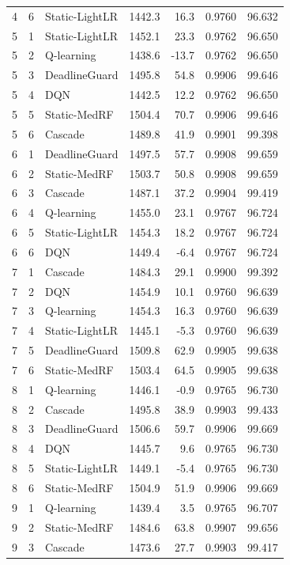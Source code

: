 \begin{longtable}{rrlrrrr}
4 & 6 & Static-LightLR & 1442.3 & 16.3 & 0.9760 & 96.632\\
5 & 1 & Static-LightLR & 1452.1 & 23.3 & 0.9762 & 96.650\\
5 & 2 & Q-learning & 1438.6 & -13.7 & 0.9762 & 96.650\\
5 & 3 & DeadlineGuard & 1495.8 & 54.8 & 0.9906 & 99.646\\
5 & 4 & DQN & 1442.5 & 12.2 & 0.9762 & 96.650\\
5 & 5 & Static-MedRF & 1504.4 & 70.7 & 0.9906 & 99.646\\
5 & 6 & Cascade & 1489.8 & 41.9 & 0.9901 & 99.398\\
6 & 1 & DeadlineGuard & 1497.5 & 57.7 & 0.9908 & 99.659\\
6 & 2 & Static-MedRF & 1503.7 & 50.8 & 0.9908 & 99.659\\
6 & 3 & Cascade & 1487.1 & 37.2 & 0.9904 & 99.419\\
6 & 4 & Q-learning & 1455.0 & 23.1 & 0.9767 & 96.724\\
6 & 5 & Static-LightLR & 1454.3 & 18.2 & 0.9767 & 96.724\\
6 & 6 & DQN & 1449.4 & -6.4 & 0.9767 & 96.724\\
7 & 1 & Cascade & 1484.3 & 29.1 & 0.9900 & 99.392\\
7 & 2 & DQN & 1454.9 & 10.1 & 0.9760 & 96.639\\
7 & 3 & Q-learning & 1454.3 & 16.3 & 0.9760 & 96.639\\
7 & 4 & Static-LightLR & 1445.1 & -5.3 & 0.9760 & 96.639\\
7 & 5 & DeadlineGuard & 1509.8 & 62.9 & 0.9905 & 99.638\\
7 & 6 & Static-MedRF & 1503.4 & 64.5 & 0.9905 & 99.638\\
8 & 1 & Q-learning & 1446.1 & -0.9 & 0.9765 & 96.730\\
8 & 2 & Cascade & 1495.8 & 38.9 & 0.9903 & 99.433\\
8 & 3 & DeadlineGuard & 1506.6 & 59.7 & 0.9906 & 99.669\\
8 & 4 & DQN & 1445.7 & 9.6 & 0.9765 & 96.730\\
8 & 5 & Static-LightLR & 1449.1 & -5.4 & 0.9765 & 96.730\\
8 & 6 & Static-MedRF & 1504.9 & 51.9 & 0.9906 & 99.669\\
9 & 1 & Q-learning & 1439.4 & 3.5 & 0.9765 & 96.707\\
9 & 2 & Static-MedRF & 1484.6 & 63.8 & 0.9907 & 99.656\\
9 & 3 & Cascade & 1473.6 & 27.7 & 0.9903 & 99.417\\

\end{longtable}
